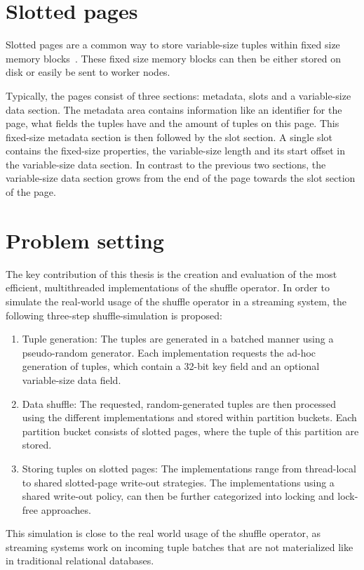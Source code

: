 \section{Slotted pages}
Slotted pages are a common way to store variable-size tuples within fixed size memory blocks~\parencite{Data-page-layouts-for-relational-databases}.
These fixed size memory blocks can then be either stored on disk or easily be sent to worker nodes.

Typically, the pages consist of three sections: metadata, slots and a variable-size data section.
The metadata area contains information like an identifier for the page, what fields the tuples have and the amount of tuples on this page.
This fixed-size metadata section is then followed by the slot section.
A single slot contains the fixed-size properties, the variable-size length and its start offset in the variable-size data section.
In contrast to the previous two sections, the variable-size data section grows from the end of the page towards the slot section of the page.

\section{Problem setting}
The key contribution of this thesis is the creation and evaluation of the most efficient, multithreaded implementations of the shuffle operator.
In order to simulate the real-world usage of the shuffle operator in a streaming system, the following three-step shuffle-simulation is proposed:

\begin{enumerate}
  \item Tuple generation: The tuples are generated in a batched manner using a pseudo-random generator.
        Each implementation requests the ad-hoc generation of tuples, which contain a 32-bit key field and an optional variable-size data field.

  \item Data shuffle: The requested, random-generated tuples are then processed using the different implementations and stored within partition buckets.
        Each partition bucket consists of slotted pages, where the tuple of this partition are stored.

  \item Storing tuples on slotted pages: The implementations range from thread-local to shared slotted-page write-out strategies.
        The implementations using a shared write-out policy, can then be further categorized into locking and lock-free approaches.
\end{enumerate}
This simulation is close to the real world usage of the shuffle operator, as streaming systems work on incoming tuple batches that are not materialized like in traditional relational databases.


